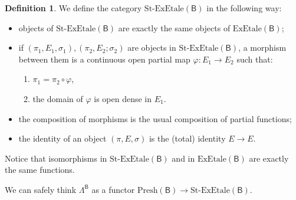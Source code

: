 \documentclass[11pt]{amsart}
\newcommand{\Presh}{\textrm{Presh}}
\newcommand{\stexetale}{\textrm{St-ExEtale}}
\newcommand{\exetale}{\textrm{ExEtale}}
\theoremstyle{plain}
\theoremstyle{definition}
\newtheorem{definition}[theorem]{Definition}
\theoremstyle{plain}
\theoremstyle{remark}
\newcommand{\bool}[1]{\mathsf{#1}}
\newcommand{\0}{\mathsf{0}}
\renewcommand{\1}{\mathsf{1}}
\renewcommand{\2}{\mathsf{2}}
\theoremstyle{definition}
\begin{document}
\begin{definition}\label{def:partmorphsimsExEtBpresh}
We define the category $\stexetale(\bool{B})$ in the following way:
\begin{itemize}
\item objects of $\stexetale(\bool{B})$ are exactly the same objects of $\exetale(\bool{B})$;
\item if $(\pi_1, E_1, \sigma_1), (\pi_2, E_2; \sigma_2)$ are objects in $\stexetale(\bool{B})$, a morphism between them is a continuous open partial map $\varphi:E_1\to E_2$ such that:
\begin{enumerate}
\item $\pi_1=\pi_2\circ\varphi$,
\item the domain of $\varphi$ is open dense in $E_1$.
\end{enumerate}
\item the composition of morphisms is the usual composition of partial functions;%
\item the identity of an object $(\pi, E, \sigma)$ is the (total) identity $E\to E$.
\end{itemize}
\end{definition}
Notice that isomorphisms in  $\stexetale(\bool{B})$ and in $\exetale(\bool{B})$ are exactly the same functions.

We can safely think $\Lambda^{\bool{B}}$ as a functor $\Presh(\bool{B})\to\stexetale(\bool{B})$.
\end{document}
